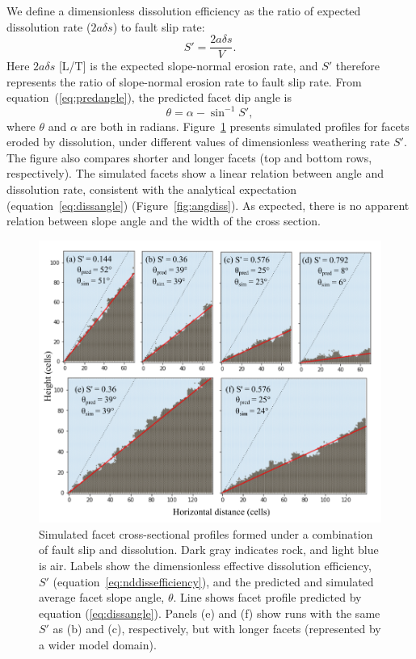 We define a dimensionless dissolution efficiency as the ratio of expected dissolution rate ($2a\delta s$) to fault slip rate:
\begin{equation}
S' = \frac{2a\delta s}{V}.
\label{eq:nddissefficiency}
\end{equation}
Here $2a\delta s$ [L/T] is the expected slope-normal erosion rate, and $S'$ therefore represents the ratio of slope-normal erosion rate to fault slip rate. From equation~(\ref{eq:predangle}), the predicted facet dip angle is
\begin{equation}
\theta = \alpha - \sin^{-1} S',
\label{eq:dissangle}
\end{equation}
where $\theta$ and $\alpha$ are both in radians. Figure~\ref{fig:dissruns} presents simulated profiles for facets eroded by dissolution, under different values of dimensionless weathering rate $S'$. The figure also compares shorter and longer facets (top and bottom rows, respectively). The simulated facets show a linear relation between angle and dissolution rate, consistent with the analytical expectation (equation~\ref{eq:dissangle}) (Figure~\ref{fig:angdiss}). As expected, there is no apparent relation between slope angle and the width of the cross section.

\begin{figure}[ht!]
\centerline{\includegraphics{figure7.pdf}}
\caption{Simulated facet cross-sectional profiles formed under a combination of fault slip and dissolution. Dark gray indicates rock, and light blue is air. Labels show the dimensionless effective dissolution efficiency, $S'$ (equation~\ref{eq:nddissefficiency}), and the predicted and simulated average facet slope angle, $\theta$. Line shows facet profile predicted by equation (\ref{eq:dissangle}). Panels (e) and (f) show runs with the same $S'$ as (b) and (c), respectively, but with longer facets (represented by a wider model domain).}
\label{fig:dissruns}
\end{figure}

